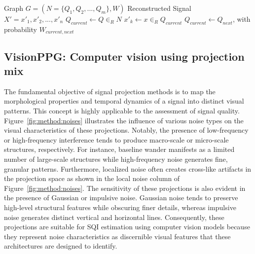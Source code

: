 \documentclass[final,3p,times,twocolumn]{elsarticle}
\begin{document}
\begin{algorithm}[t!]
    \begin{algorithmic}
        \Require Graph $G=(N=\{Q_1, Q_2, ..., Q_m\},W)$
        \Ensure Reconstructed Signal $X'=x'_1,x'_2,...,x'_n$
        \State $Q_{current} \gets Q \in_R N$ 
            \State $x'_k \gets x \in_R Q_{current}$
            \State $Q_{current} \gets Q_{next}$, with probability $W_{current,next}$
        \EndFor
    \end{algorithmic}
    \caption{The probabilistic signal representation algorithm. }
    \label{alg:mtf_reconstruction}
\end{algorithm}


\subsection{VisionPPG: Computer vision using projection mix}

The fundamental objective of signal projection methods is to map the morphological properties and temporal dynamics of a signal into distinct visual patterns.
This concept is highly applicable to the assessment of signal quality.
Figure~\ref{fig:method:noises} illustrates the influence of various noise types on the visual characteristics of these projections.
Notably, the presence of low-frequency or high-frequency interference tends to produce macro-scale or micro-scale structures, respectively.
For instance, baseline wander manifests as a limited number of large-scale structures while high-frequency noise generates fine, granular patterns.
Furthermore, localized noise often creates cross-like artifacts in the projection space as shown in the local noise column of Figure~\ref{fig:method:noises}.
The sensitivity of these projections is also evident in the presence of Gaussian or impulsive noise. Gaussian noise tends to preserve high-level structural features while obscuring finer details, whereas impulsive noise generates distinct vertical and horizontal lines.
Consequently, these projections are suitable for \gls{SQI} estimation using computer vision models because they represent noise characteristics as discernible visual features that these architectures are designed to identify.
\end{document}
